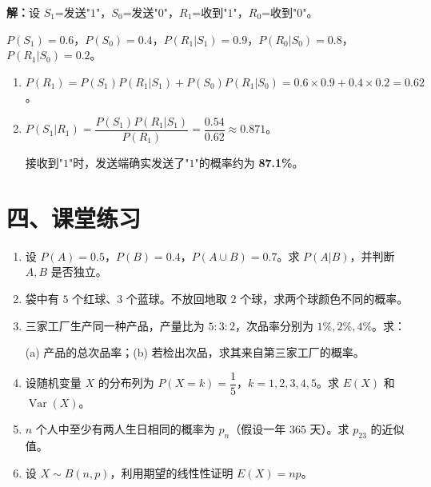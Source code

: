 \documentclass[12pt, a4paper]{ctexart}
\begin{document}
\textbf{解：}\quad 设 $S_1$=发送"$1$"，$S_0$=发送"$0$"，$R_1$=收到"$1$"，$R_0$=收到"$0$"。\par
$P(S_1)=0.6$，$P(S_0)=0.4$，$P(R_1|S_1)=0.9$，$P(R_0|S_0)=0.8$，$P(R_1|S_0)=0.2$。
\begin{enumerate}[leftmargin=1.5em]
  \item $P(R_1)=P(S_1)P(R_1|S_1)+P(S_0)P(R_1|S_0)=0.6\times0.9+0.4\times0.2=0.62$。
  \item $P(S_1|R_1)=\dfrac{P(S_1)P(R_1|S_1)}{P(R_1)}=\dfrac{0.54}{0.62}\approx 0.871$。\par
  接收到"$1$"时，发送端确实发送了"$1$"的概率约为 \textbf{87.1\%}。
\end{enumerate}

\section*{\textcolor{tipgreen}{四、课堂练习}}

\begin{enumerate}[leftmargin=1.5em]
  \item 设 $P(A)=0.5$，$P(B)=0.4$，$P(A\cup B)=0.7$。求 $P(A|B)$，并判断 $A,B$ 是否独立。
  \item 袋中有 $5$ 个红球、$3$ 个蓝球。不放回地取 $2$ 个球，求两个球颜色不同的概率。
  \item 三家工厂生产同一种产品，产量比为 $5:3:2$，次品率分别为 $1\%,2\%,4\%$。求：\par
  (a) 产品的总次品率；(b) 若检出次品，求其来自第三家工厂的概率。
  \item 设随机变量 $X$ 的分布列为 $P(X=k)=\dfrac{1}{5}$，$k=1,2,3,4,5$。求 $E(X)$ 和 $\operatorname{Var}(X)$。
  \item $n$ 个人中至少有两人生日相同的概率为 $p_n$（假设一年 $365$ 天）。求 $p_{23}$ 的近似值。
  \item 设 $X\sim B(n,p)$，利用期望的线性性证明 $E(X)=np$。
\end{enumerate}

\vspace{10pt}
\end{document}
